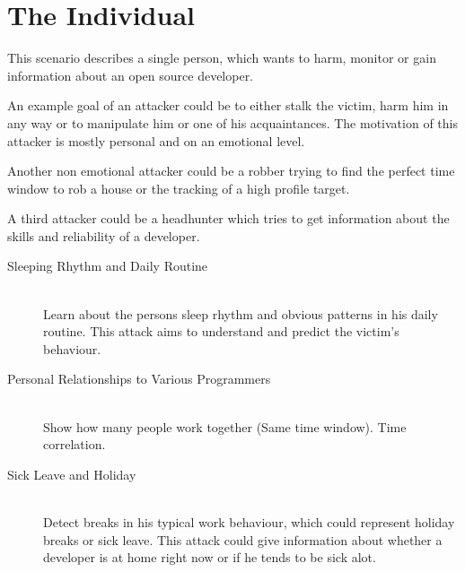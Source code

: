 \section{The Individual}
This scenario describes a single person, which wants to harm, monitor or gain information about an open source developer.

An example goal of an attacker could be to either stalk the victim, harm him in any way or to manipulate him or one of his acquaintances.
The motivation of this attacker is mostly personal and on an emotional level.

Another non emotional attacker could be a robber trying to find the perfect time window to rob a house or the tracking of a high profile target.

A third attacker could be a headhunter which tries to get information about the skills and reliability of a developer.

\begin{description}
    \item[Sleeping Rhythm and Daily Routine] \hfill \\
        Learn about the persons sleep rhythm and obvious patterns in his daily routine.
        This attack aims to understand and predict the victim's behaviour.

    \item[Personal Relationships to Various Programmers] \hfill \\
        Show how many people work together (Same time window). Time correlation.

    \item[Sick Leave and Holiday] \hfill \\
        Detect breaks in his typical work behaviour, which could represent holiday breaks or sick leave.
        This attack could give information about whether a developer is at home right now or if he tends to be sick alot.
\end{description}



